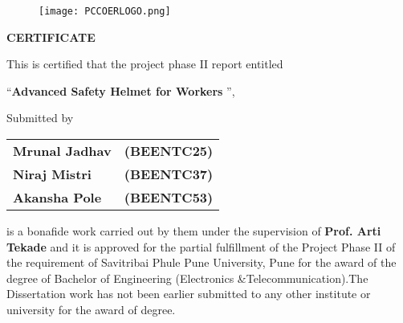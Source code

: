 \documentclass[12pt,a4paper]{report}
\begin{document}
\begin{center}
\begin{figure}[htp]
    \centering
    \texttt{[image: PCCOERLOGO.png]}
\end{figure}    
\end{center}

\begin{center}
    
\noindent \textbf{CERTIFICATE}
\end{center}
\begin{center}
\noindent This is certified that the project phase II report entitled

\noindent ``\textbf{Advanced Safety Helmet for Workers} '',

\noindent               Submitted by
\end{center}
\begin{center}

\normalsize{}
\begin{tabular}{ll}
\textbf{Mrunal Jadhav}    & \textbf{(BEENTC25)} \\
\textbf{Niraj Mistri} & \textbf{(BEENTC37)} \\
\textbf{Akansha Pole}   & \textbf{(BEENTC53)} 
\end{tabular}
\end{center}
\noindent is a bonafide work carried out by them under the supervision of \textbf{Prof. Arti Tekade }and it is approved for the partial fulfillment of the Project Phase II of the requirement of Savitribai Phule Pune University, Pune for the award of the degree of Bachelor of Engineering (Electronics \&Telecommunication).The Dissertation work has not been earlier submitted to any other institute or university for the award of degree.
\newline
\newline
\noindent 
\end{document}
